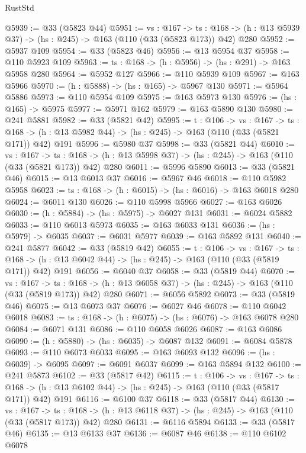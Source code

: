 \begin{lexlean}{RustStd}
\begin{coremodule}
@5939 := @33 (@5823 @44)
@5951 := {vs : @167} ->
  {ts : @168} -> (h : @13 @5939 @37) -> (hs : @245) -> @163 (@110 (@33 (@5823 @173)) @42) @280
@5952 := @5937 @109
@5954 := @33 (@5823 @46)
@5956 := @13 @5954 @37
@5958 := @110 @5923 @109
@5963 := {ts : @168} -> (h : @5956) -> (hs : @291) -> @163 @5958 @280
@5964 := @5952 @127
@5966 := @110 @5939 @109
@5967 := @163 @5966
@5970 := (h : @5888) -> (hs : @165) -> @5967 @130
@5971 := @5964 @5886
@5973 := @110 @5954 @109
@5975 := @163 @5973 @130
@5976 := (hs : @165) -> @5975
@5977 := @5971 @162
@5979 := @163 @5890 @130
@5980 := @241 @5881
@5982 := @33 (@5821 @42)
@5995 := {t : @106} ->
  {vs : @167} ->
  {ts : @168} -> (h : @13 @5982 @44) -> (hs : @245) -> @163 (@110 (@33 (@5821 @171)) @42) @191
@5996 := @5980 @37
@5998 := @33 (@5821 @44)
@6010 := {vs : @167} ->
  {ts : @168} -> (h : @13 @5998 @37) -> (hs : @245) -> @163 (@110 (@33 (@5821 @173)) @42) @280
@6011 := @5996 @5890
@6013 := @33 (@5821 @46)
@6015 := @13 @6013 @37
@6016 := @5967 @46
@6018 := @110 @5982 @5958
@6023 := {ts : @168} -> (h : @6015) -> (hs : @6016) -> @163 @6018 @280
@6024 := @6011 @130
@6026 := @110 @5998 @5966
@6027 := @163 @6026
@6030 := (h : @5884) -> (hs : @5975) -> @6027 @131
@6031 := @6024 @5882
@6033 := @110 @6013 @5973
@6035 := @163 @6033 @131
@6036 := (hs : @5979) -> @6035
@6037 := @6031 @5977
@6039 := @163 @5892 @131
@6040 := @241 @5877
@6042 := @33 (@5819 @42)
@6055 := {t : @106} ->
  {vs : @167} ->
  {ts : @168} -> (h : @13 @6042 @44) -> (hs : @245) -> @163 (@110 (@33 (@5819 @171)) @42) @191
@6056 := @6040 @37
@6058 := @33 (@5819 @44)
@6070 := {vs : @167} ->
  {ts : @168} -> (h : @13 @6058 @37) -> (hs : @245) -> @163 (@110 (@33 (@5819 @173)) @42) @280
@6071 := @6056 @5892
@6073 := @33 (@5819 @46)
@6075 := @13 @6073 @37
@6076 := @6027 @46
@6078 := @110 @6042 @6018
@6083 := {ts : @168} -> (h : @6075) -> (hs : @6076) -> @163 @6078 @280
@6084 := @6071 @131
@6086 := @110 @6058 @6026
@6087 := @163 @6086
@6090 := (h : @5880) -> (hs : @6035) -> @6087 @132
@6091 := @6084 @5878
@6093 := @110 @6073 @6033
@6095 := @163 @6093 @132
@6096 := (hs : @6039) -> @6095
@6097 := @6091 @6037
@6099 := @163 @5894 @132
@6100 := @241 @5873
@6102 := @33 (@5817 @42)
@6115 := {t : @106} ->
  {vs : @167} ->
  {ts : @168} -> (h : @13 @6102 @44) -> (hs : @245) -> @163 (@110 (@33 (@5817 @171)) @42) @191
@6116 := @6100 @37
@6118 := @33 (@5817 @44)
@6130 := {vs : @167} ->
  {ts : @168} -> (h : @13 @6118 @37) -> (hs : @245) -> @163 (@110 (@33 (@5817 @173)) @42) @280
@6131 := @6116 @5894
@6133 := @33 (@5817 @46)
@6135 := @13 @6133 @37
@6136 := @6087 @46
@6138 := @110 @6102 @6078

\end{coremodule}
\end{lexlean}
